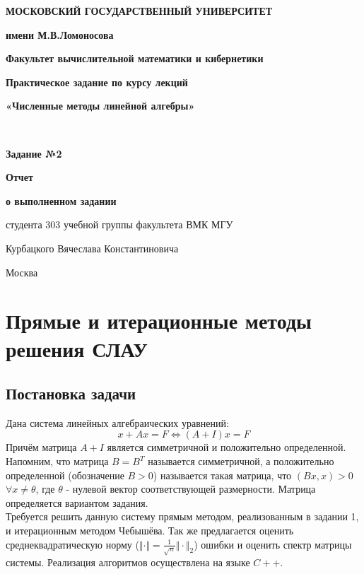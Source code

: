 \documentclass[a4paper,12pt,titlepage,final]{article}
\begin{document}
\begin{titlepage}
\centering\noindent
{
\begin{minipage}{0.1\textwidth}

\end{minipage}
\hfill
\begin{minipage}{0.77\textwidth}
\begin{center}
\textbf{МОСКОВСКИЙ ГОСУДАРСТВЕННЫЙ УНИВЕРСИТЕТ}\par
\textbf{имени М.В.Ломоносова}\par
\end{center}
\end{minipage}
\hfill
\begin{minipage}{0.1\textwidth}

\end{minipage}
}\par
{
\textbf{Факультет вычислительной математики и кибернетики}\par
\nointerlineskip
\noindent\makebox[\linewidth]{\rule{\textwidth}{0.4pt}}
}
\vfill
{
\Large{\textbf{Практическое задание по курсу лекций}}\par
\Large{\textbf{«Численные методы линейной алгебры»}}\par
}\\
{
\Large{\textbf{Задание №2}}\par
}
{
\Large{\textbf{Отчет}}\par
\Large{\textbf{о выполненном задании}}\par
\Large{студента 303 учебной группы факультета ВМК МГУ}\par
\Large{Курбацкого Вячеслава Константиновича}\par
}
\vfill
{\small Москва\\ \the\year{}}
\end{titlepage}
\tableofcontents
\newpage
\section{Прямые и итерационные методы решения СЛАУ}
\subsection{Постановка задачи}
Дана система линейных алгебраических уравнений:
$$x + Ax = F \Leftrightarrow (A + I)x = F$$
Причём матрица $A + I$ является симметричной и положительно определенной. Напомним, что матрица $B = B^T$ называется симметричной, а положительно определенной (обозначение $B > 0$) называется такая матрица, что $(Bx, x) > 0$ $\forall x \neq \theta$, где $\theta$ - нулевой вектор соответствующей размерности. Матрица определяется вариантом задания. \\
Требуется решить данную систему прямым методом, реализованным в задании 1, и итерационным методом Чебышёва. Так же предлагается оценить среднеквадратическую норму ($\Vert \cdot \Vert = \frac{1}{\sqrt{n}} \Vert \cdot \Vert_2$) ошибки и оценить спектр матрицы системы. Реализация алгоритмов осуществлена на языке $C++$.
\end{document}
